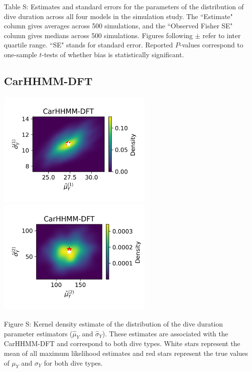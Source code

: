 \documentclass{article}
\begin{document}
        \noindent Table S: Estimates and standard errors for the parameters of the distribution of dive duration across all four models in the simulation study. The ``Estimate" column gives averages across 500 simulations, and the ``Observed Fisher SE" column gives medians across 500 simulations. Figures following $\pm$ refer to inter quartile range. ``SE" stands for standard error. Reported $P$-values correspond to one-sample $t$-tests of whether bias is statistically significant.
        \addtocounter{tablenum}{1}
        
        \newpage
        
        \subsection{CarHHMM-DFT}
        \begin{center}
        \includegraphics[width=3in]{../Plots/hhmm_FV_MLE_density_dive_duration_-1_0.png}
        \includegraphics[width=3in]{../Plots/hhmm_FV_MLE_density_dive_duration_-1_1.png}
        \end{center}
        
        \noindent Figure S: Kernel density estimate of the distribution of the dive duration parameter estimators ($\hat \mu_Y$ and $\hat \sigma_Y$). These estimates are associated with the CarHHMM-DFT and correspond to both dive types. White stars represent the mean of all maximum likelihood estimates and red stars represent the true values of $\mu_Y$ and $\sigma_Y$ for both dive types.
        \addtocounter{fignum}{1}
        
\end{document}
